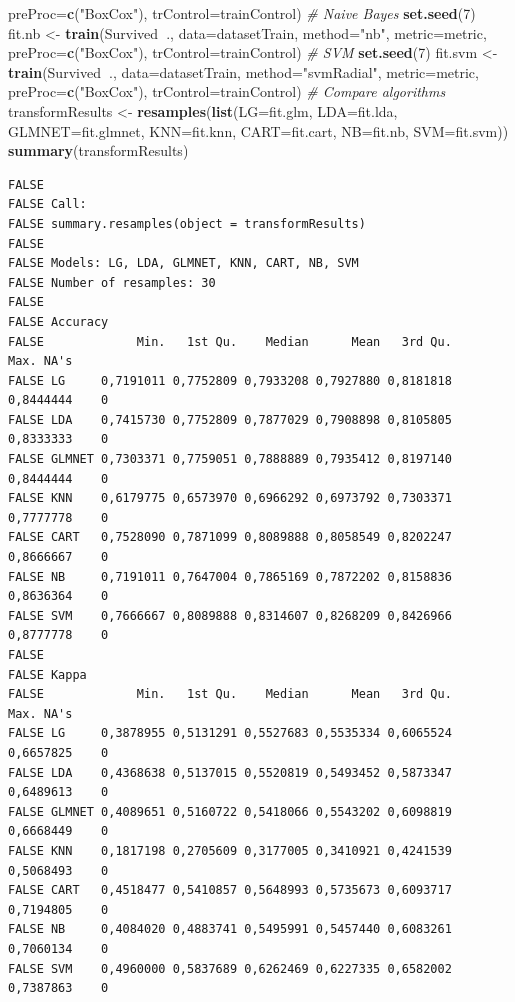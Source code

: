 \documentclass[]{article}
\newenvironment{Shaded}{\begin{snugshade}}{\end{snugshade}}
\newcommand{\KeywordTok}[1]{\textcolor[rgb]{0.13,0.29,0.53}{\textbf{#1}}}
\newcommand{\DataTypeTok}[1]{\textcolor[rgb]{0.13,0.29,0.53}{#1}}
\newcommand{\DecValTok}[1]{\textcolor[rgb]{0.00,0.00,0.81}{#1}}
\newcommand{\StringTok}[1]{\textcolor[rgb]{0.31,0.60,0.02}{#1}}
\newcommand{\CommentTok}[1]{\textcolor[rgb]{0.56,0.35,0.01}{\textit{#1}}}
\newcommand{\OperatorTok}[1]{\textcolor[rgb]{0.81,0.36,0.00}{\textbf{#1}}}
\newcommand{\NormalTok}[1]{#1}
\begin{document}
\begin{Shaded}
\begin{Highlighting}[]
    \DataTypeTok{preProc=}\KeywordTok{c}\NormalTok{(}\StringTok{"BoxCox"}\NormalTok{), }\DataTypeTok{trControl=}\NormalTok{trainControl)}
\CommentTok{# Naive Bayes}
\KeywordTok{set.seed}\NormalTok{(}\DecValTok{7}\NormalTok{)}
\NormalTok{fit.nb <-}\StringTok{ }\KeywordTok{train}\NormalTok{(Survived}\OperatorTok{~}\NormalTok{., }\DataTypeTok{data=}\NormalTok{datasetTrain, }\DataTypeTok{method=}\StringTok{"nb"}\NormalTok{, }\DataTypeTok{metric=}\NormalTok{metric, }\DataTypeTok{preProc=}\KeywordTok{c}\NormalTok{(}\StringTok{"BoxCox"}\NormalTok{),}
    \DataTypeTok{trControl=}\NormalTok{trainControl)}
\CommentTok{# SVM}
\KeywordTok{set.seed}\NormalTok{(}\DecValTok{7}\NormalTok{)}
\NormalTok{fit.svm <-}\StringTok{ }\KeywordTok{train}\NormalTok{(Survived}\OperatorTok{~}\NormalTok{., }\DataTypeTok{data=}\NormalTok{datasetTrain, }\DataTypeTok{method=}\StringTok{"svmRadial"}\NormalTok{, }\DataTypeTok{metric=}\NormalTok{metric,}
    \DataTypeTok{preProc=}\KeywordTok{c}\NormalTok{(}\StringTok{"BoxCox"}\NormalTok{), }\DataTypeTok{trControl=}\NormalTok{trainControl)}
\CommentTok{# Compare algorithms}
\NormalTok{transformResults <-}\StringTok{ }\KeywordTok{resamples}\NormalTok{(}\KeywordTok{list}\NormalTok{(}\DataTypeTok{LG=}\NormalTok{fit.glm, }\DataTypeTok{LDA=}\NormalTok{fit.lda, }\DataTypeTok{GLMNET=}\NormalTok{fit.glmnet, }\DataTypeTok{KNN=}\NormalTok{fit.knn,}
    \DataTypeTok{CART=}\NormalTok{fit.cart, }\DataTypeTok{NB=}\NormalTok{fit.nb, }\DataTypeTok{SVM=}\NormalTok{fit.svm))}
\KeywordTok{summary}\NormalTok{(transformResults)}
\end{Highlighting}
\end{Shaded}

\begin{verbatim}
FALSE 
FALSE Call:
FALSE summary.resamples(object = transformResults)
FALSE 
FALSE Models: LG, LDA, GLMNET, KNN, CART, NB, SVM 
FALSE Number of resamples: 30 
FALSE 
FALSE Accuracy 
FALSE             Min.   1st Qu.    Median      Mean   3rd Qu.      Max. NA's
FALSE LG     0,7191011 0,7752809 0,7933208 0,7927880 0,8181818 0,8444444    0
FALSE LDA    0,7415730 0,7752809 0,7877029 0,7908898 0,8105805 0,8333333    0
FALSE GLMNET 0,7303371 0,7759051 0,7888889 0,7935412 0,8197140 0,8444444    0
FALSE KNN    0,6179775 0,6573970 0,6966292 0,6973792 0,7303371 0,7777778    0
FALSE CART   0,7528090 0,7871099 0,8089888 0,8058549 0,8202247 0,8666667    0
FALSE NB     0,7191011 0,7647004 0,7865169 0,7872202 0,8158836 0,8636364    0
FALSE SVM    0,7666667 0,8089888 0,8314607 0,8268209 0,8426966 0,8777778    0
FALSE 
FALSE Kappa 
FALSE             Min.   1st Qu.    Median      Mean   3rd Qu.      Max. NA's
FALSE LG     0,3878955 0,5131291 0,5527683 0,5535334 0,6065524 0,6657825    0
FALSE LDA    0,4368638 0,5137015 0,5520819 0,5493452 0,5873347 0,6489613    0
FALSE GLMNET 0,4089651 0,5160722 0,5418066 0,5543202 0,6098819 0,6668449    0
FALSE KNN    0,1817198 0,2705609 0,3177005 0,3410921 0,4241539 0,5068493    0
FALSE CART   0,4518477 0,5410857 0,5648993 0,5735673 0,6093717 0,7194805    0
FALSE NB     0,4084020 0,4883741 0,5495991 0,5457440 0,6083261 0,7060134    0
FALSE SVM    0,4960000 0,5837689 0,6262469 0,6227335 0,6582002 0,7387863    0
\end{verbatim}
\end{document}
